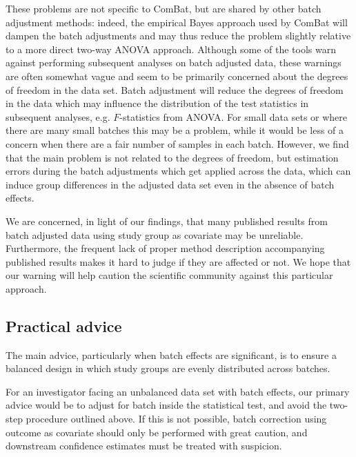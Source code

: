 \documentclass{bio}
\begin{document}
These problems are not specific to ComBat, but are shared by other batch adjustment methods: indeed, the empirical Bayes approach used by ComBat  will dampen the batch adjustments and may thus reduce the problem slightly relative to a more direct two-way ANOVA approach. Although some of the tools warn against performing subsequent analyses on batch adjusted data, these warnings are often somewhat vague and seem to be primarily concerned about the degrees of freedom in the data set. Batch adjustment will reduce the degrees of freedom in the data which may influence the distribution of the test statistics in subsequent analyses, e.g. $F$-statistics from ANOVA. For small data sets or where there are many small batches this may be a problem, while it would be less of a concern when there are a fair number of samples in each batch. However, we find that the main problem is not related to the degrees of freedom, but estimation errors during the batch adjustments which get applied across the data, which can induce group differences in the adjusted data set even in the absence of batch effects.

We are concerned, in light of our findings, that many published results from batch adjusted data using study group as covariate may be unreliable. Furthermore, the frequent lack of proper method description accompanying published results makes it hard to judge if they are affected or not. We hope that our warning will help caution the scientific community against this particular approach.


\subsection{Practical advice}

The main advice, particularly when batch effects are significant, is to ensure a balanced design in which study groups are evenly distributed across batches.

For an investigator facing an unbalanced data set with batch effects, our primary advice would be to adjust for batch inside the statistical test, and avoid the two-step procedure outlined above. If this is not possible, batch correction using outcome as covariate should only be performed with great caution, and downstream confidence estimates must be treated with suspicion.
\end{document}
